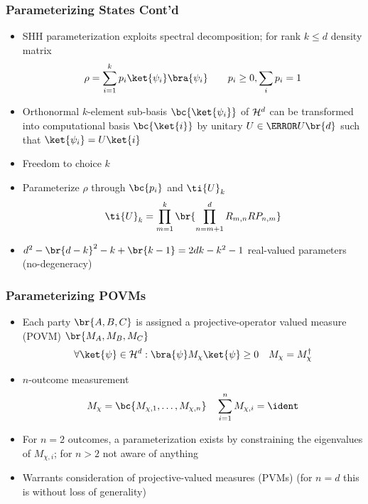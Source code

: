 \documentclass[
    hyperref={colorlinks=true, linkcolor=blue, urlcolor=blue, citecolor=MidnightBlue},
    xcolor={dvipsnames},
]{beamer}
\renewcommand{\term}[1]{\textcolor{Mahogany}{#1}}
\begin{document}
\begin{frame}
    \frametitle{Parameterizing States Cont'd}
    \begin{itemize}
        \item \term{SHH parameterization} \cite{Spengler_2010_Unitary} exploits spectral decomposition; for rank $k \leq d$ density matrix
        \[ \rho = \sum_{i=1}^{k} p_i \ket{\psi_i} \bra{\psi_i} \qquad p_i \geq 0, \sum_i p_i = 1 \]
        \item Orthonormal $k$-element sub-basis $\bc{\ket{\psi_i}}$ of $\mathcal{H}^d$ can be transformed into computational basis $\bc{\ket{i}}$ by unitary $U \in \s{U}\br{d}$ such that $\ket{\psi_i} = U \ket{i}$
        \item Freedom to choice $k$
        \item Parameterize $\rho$ through $\bc{p_i}$ and $\ti{U}_{k}$
        \[ \ti{U}_{k} = \prod_{m=1}^{k} \br{\prod_{n={m+1}}^{d} R_{m,n} RP_{n,m}} \]
        \item $d^2 - \br{d-k}^2 - k + \br{k-1} = 2dk -k^2 -1$ real-valued parameters (no-degeneracy)
    \end{itemize}
\end{frame}

\begin{frame}
    \frametitle{Parameterizing POVMs}
    \begin{itemize}
        \item Each party $\br{A, B, C}$ is assigned a \term{projective-operator valued measure (POVM)} $\br{M_A, M_B, M_C}$
        \[ \forall \ket{\psi} \in \Hilb^d : \bra{\psi} M_\chi \ket{\psi} \geq 0 \quad M_\chi = M_\chi^{\dagger} \]
        \item $n$-outcome measurement
        \[ M_\chi = \bc{M_{\chi, 1}, \ldots, M_{\chi, n}} \quad \sum_{i=1}^{n} M_{\chi, i} = \ident \]
        \item For $n = 2$ outcomes, a parameterization exists by constraining the eigenvalues of $M_{\chi, i}$; for $n > 2$ not aware of anything
        \item Warrants consideration of \term{projective-valued measures (PVMs)} (for $n = d$ this is without loss of generality)
    \end{itemize}
\end{frame}
\end{document}
